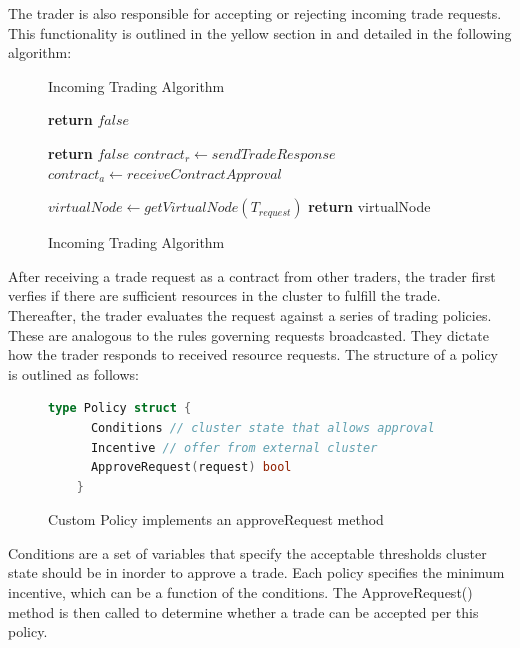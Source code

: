 The trader is also responsible for accepting or rejecting incoming trade
requests. This functionality is outlined in the yellow section in 
and detailed in the following algorithm: 

\begin{figure}[H]
\begin{algorithm}[H]
\caption{Incoming Trading Algorithm}
\begin{algorithmic}
   
    
     
      \State \textbf{return} $false$ 
    \EndIf

      \State \textbf{return} $false$ 
      \EndIf
    \EndFor
    \State $contract_r \gets sendTradeResponse$ 
    \State $contract_a \gets receiveContractApproval$ 

    \State $virtualNode \gets getVirtualNode(T_{request})$     
    \State \textbf{return} virtualNode 
  \EndProcedure
\end{algorithmic}
\end{algorithm}
\caption{Incoming Trading Algorithm}
\end{figure}

After receiving a trade request as a contract from other traders, the trader
first verfies if there are sufficient resources in the cluster to fulfill the
trade. Thereafter, the trader evaluates the request against a series of trading
policies. These are analogous to the rules governing requests broadcasted. They
dictate how the trader responds to received resource requests. The structure of
a policy is outlined as follows:

\begin{figure}[H]
  \begin{lstlisting}[language=go]
    type Policy struct {
      Conditions // cluster state that allows approval
      Incentive // offer from external cluster
      ApproveRequest(request) bool 
    } 
  \end{lstlisting}
  \caption{Custom Policy implements an approveRequest method}
\end{figure}

Conditions are a set of variables that specify the acceptable thresholds
cluster state should be in inorder to approve a trade. Each policy specifies
the minimum incentive, which can be a function of the conditions. The
ApproveRequest() method is then called to determine whether a trade can be accepted per this policy.

